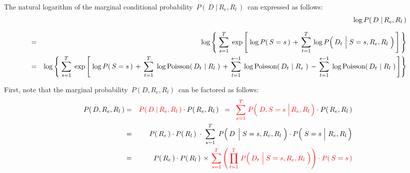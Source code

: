 \vskip 0.5cm
\begin{proposition}
\mbox{}
\vskip 0.2cm
\noindent
The natural logarithm of the marginal conditional probability
\,$P\!\left(\,D\;\vert\,R_{e},R_{l}\,\right)$\,
can expressed as follows:
\begin{eqnarray*}
&&
	\underset{{\color{white}}}{\log P\!\left(\,D \;\vert\, R_{e},R_{l}\,\right)}
\\
&=&
	\log\left\{\;
	\overset{T}{\underset{s=1}{\sum}}\;
	\exp\left[\;
		\log P\!\left(\,S=s\,\right)
		\, + \,
		\overset{T}{\underset{t=1}{\sum}}\,
		\log P\!\left(\,D_{t} \,\left\vert\; S\overset{{\color{white}1}}{=}s,R_{e},R_{l}\right.\,\right)
		\,\right]
	\,\right\}
\\
&=&
	\log\left\{\;
	\overset{T}{\underset{s=1}{\sum}}\;
	\exp\left[\;
			\log P\!\left(\,S=s\,\right)
			\,+\,
			\overset{T}{\underset{t=1}{\sum}}\;
			\log\textnormal{Poisson}\!\left(\,D_{t} \,\left\vert\; R_{l}\right.\,\right)
			\,+\,
			\overset{s-1}{\underset{t=1}{\sum}}\;
			\log\textnormal{Poisson}\!\left(\,D_{t} \,\left\vert\; R_{e}\right.\,\right)
			\,-\,
			\overset{s-1}{\underset{t=1}{\sum}}\;
			\log\textnormal{Poisson}\!\left(\,D_{t} \,\left\vert\; R_{l}\right.\,\right)
		\,\right]
	\right\}
\end{eqnarray*}
\end{proposition}
\proof
First, note that the marginal probability \,$P(D,R_{e},R_{l})$\, can be factored as follows:
\begin{eqnarray*}
P\!\left(\,D,R_{e},R_{l}\,\right)
&=&
	{\color{red}P\!\left(\,D \;\vert\, R_{e},R_{l}\,\right)}
	\cdot
	P\!\left(\,R_{e},R_{l}\,\right)
\;\; = \;\;
	{\color{red}
	\overset{T}{\underset{s=1}{\sum}}\;
	P\!\left(\,\left.D,S\overset{{\color{white}1}}{=}s \;\right\vert R_{e},R_{l}\,\right)}
	\cdot
	P\!\left(\,R_{e},R_{l}\,\right)
\\
& = &
	P\!\left(\,R_{e}\,\right)
	\cdot
	P\!\left(\,R_{l}\,\right)
	\;\cdot\;
	\overset{T}{\underset{s=1}{\sum}}\;\,
	P\!\left(\, D \;\left\vert\;S\overset{{\color{white}1}}{=}s,R_{e},R_{l} \right.\,\right)
	\cdot
	P\!\left(\,\left.S\overset{{\color{white}1}}{=}s\;\right\vert\,R_{e},R_{l}\,\right)
\\
& = &
	P\!\left(\,R_{e}\,\right)
	\cdot
	P\!\left(\,R_{l}\,\right)
	\,\times\,
	{\color{red}
	\overset{T}{\underset{s=1}{\sum}}
		\left(\,
			\overset{T}{\underset{t=1}{\prod}}\;
			P\!\left(\,D_{t} \,\left\vert\; S\overset{{\color{white}1}}{=}s,R_{e},R_{l}\right.\,\right)
			\right)
		\cdot
		P\!\left(\,S=s\,\right)
	}
\end{eqnarray*}
